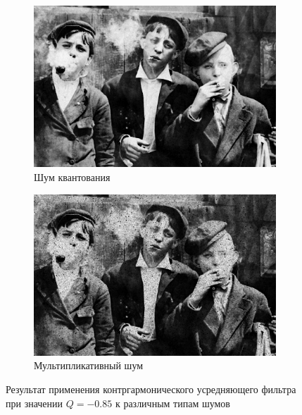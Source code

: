 \begin{figure}[ht!]
\begin{subfigure}[b]{0.5\linewidth}
      \includegraphics[width=0.95\linewidth]{../Contraharmonic_Filter/Contraharmonic_Poisson_noise_(m,n=(3,_3),q=-0.85).jpg} 
      \caption{Шум квантования} 
      \label{contraharmonic_-0.85:e}
    \end{subfigure}%
    \begin{subfigure}[b]{0.5\linewidth}
        \centering
        \includegraphics[width=0.95\linewidth]{../Contraharmonic_Filter/Contraharmonic_Speckle_noise_(m,n=(3,_3),q=-0.85).jpg} 
        \caption{Мультипликативный шум} 
        \label{contraharmonic_-0.85:f} 
    \end{subfigure} 
    \caption{Результат применения контргармонического усредняющего фильтра при значении $Q = -0.85$ к различным типам шумов}
    \label{img:contraharmonic_-0.85} 
  \end{figure}

